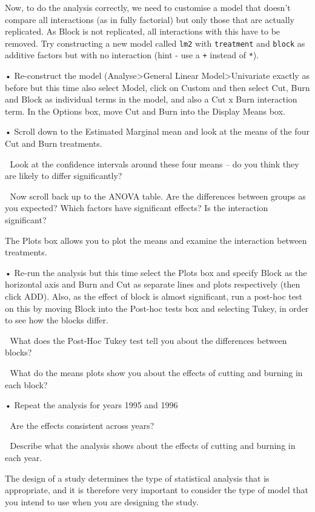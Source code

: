 \documentclass[
]{book}
\begin{document}
Now, to do the analysis correctly, we need to customise a model that doesn't compare all interactions (as in fully factorial) but only those that are actually replicated. As Block is not replicated, all interactions with this have to be removed. Try constructing a new model called \texttt{lm2} with \texttt{treatment} and \texttt{block} as additive factors but with no interaction (hint - use a \texttt{+} instead of \texttt{*}).

• Re-construct the model (Analyse\textgreater General Linear Model\textgreater Univariate exactly as before but this time also select Model, click on Custom and then select Cut, Burn and Block as individual terms in the model, and also a Cut x Burn interaction term. In the Options box, move Cut and Burn into the Display Means box.

• Scroll down to the Estimated Marginal mean and look at the means of the four Cut and Burn treatments.

 Look at the confidence intervals around these four means -- do you think they are likely to differ significantly?

 Now scroll back up to the ANOVA table. Are the differences between groups as you expected? Which factors have significant effects? Is the interaction significant?

The Plots box allows you to plot the means and examine the interaction between treatments.

• Re-run the analysis but this time select the Plots box and specify Block as the horizontal axis and Burn and Cut as separate lines and plots respectively (then click ADD). Also, as the effect of block is almost significant, run a post-hoc test on this by moving Block into the Post-hoc tests box and selecting Tukey, in order to see how the blocks differ.

 What does the Post-Hoc Tukey test tell you about the differences between blocks?

 What do the means plots show you about the effects of cutting and burning in each block?

• Repeat the analysis for years 1995 and 1996

 Are the effects consistent across years?

 Describe what the analysis shows about the effects of cutting and burning in each year.

The design of a study determines the type of statistical analysis that is appropriate, and it is therefore very important to consider the type of model that you intend to use when you are designing the study.

  
\end{document}
